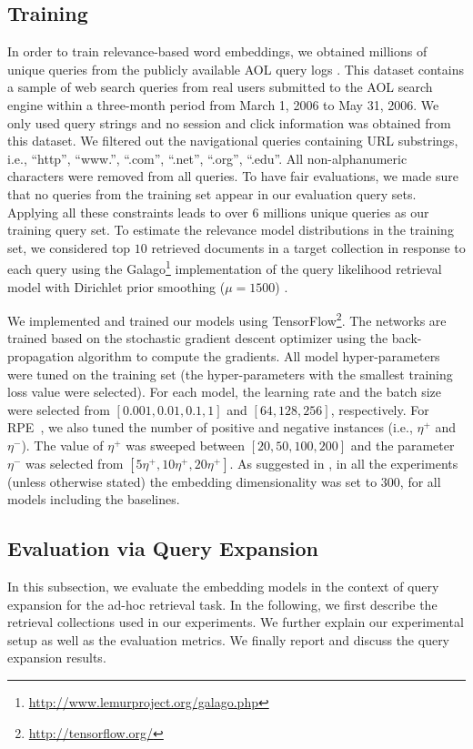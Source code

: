 \documentclass[sigconf]{acmart}
\begin{document}
\subsection{Training}
In order to train relevance-based word embeddings, we obtained millions of unique queries from the publicly available AOL query logs \cite{Pass:2006}. This dataset contains a sample of web search queries from real users submitted to the AOL search engine within a three-month period from March 1, 2006 to May 31, 2006. We only used query strings and no session and click information was obtained from this dataset. We filtered out the navigational queries containing URL substrings, i.e., ``http'', ``www.'', ``.com'', ``.net'', ``.org'', ``.edu''. All non-alphanumeric characters were removed from all queries. To have fair evaluations, we made sure that no queries from the training set appear in our evaluation query sets. Applying all these constraints leads to over $6$ millions unique queries as our training query set. To estimate the relevance model distributions in the training set, we considered top $10$ retrieved documents in a target collection in response to each query using the Galago\footnote{\url{http://www.lemurproject.org/galago.php}} implementation of the query likelihood retrieval model \cite{Ponte:1998} with Dirichlet prior smoothing ($\mu=1500$) \cite{Zhai:2004}.

We implemented and trained our models using TensorFlow\footnote{\url{http://tensorflow.org/}}. The networks are trained based on the stochastic gradient descent optimizer using the back-propagation algorithm \cite{Rumelhart:1986} to compute the gradients. All model hyper-parameters were tuned on the training set (the hyper-parameters with the smallest training loss value were selected). For each model, the learning rate and the batch size were selected from $[0.001, 0.01, 0.1, 1]$ and $[64, 128, 256]$, respectively. For {RPE~}, we also tuned the number of positive and negative instances (i.e., $\eta^+$ and $\eta^-$). The value of $\eta^+$ was sweeped between $[20, 50, 100, 200]$ and the parameter $\eta^-$ was selected from $[5\eta^+, 10\eta^+, 20\eta^+]$. As suggested in \cite{Zamani:2016:ICTIR:emb}, in all the experiments (unless otherwise stated) the embedding dimensionality was set to $300$, for all models including the baselines.

\subsection{Evaluation via Query Expansion}
In this subsection, we evaluate the embedding models in the context of query expansion for the ad-hoc retrieval task. In the following, we first describe the retrieval collections used in our experiments. We further explain our experimental setup as well as the evaluation metrics. We finally report and discuss the query expansion results.
\end{document}
